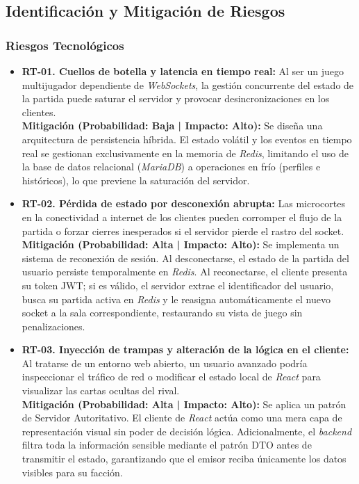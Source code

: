 \subsection{Identificación y Mitigación de Riesgos}

\subsubsection{Riesgos Tecnológicos}

\begin{itemize}
    \item \textbf{RT-01. Cuellos de botella y latencia en tiempo real:} Al ser un juego multijugador dependiente de \textit{WebSockets}, la gestión concurrente del estado de la partida puede saturar el servidor y provocar desincronizaciones en los clientes. \\
    \textbf{Mitigación (Probabilidad: Baja | Impacto: Alto):} Se diseña una arquitectura de persistencia híbrida. El estado volátil y los eventos en tiempo real se gestionan exclusivamente en la memoria de \textit{Redis}, limitando el uso de la base de datos relacional (\textit{MariaDB}) a operaciones en frío (perfiles e históricos), lo que previene la saturación del servidor.
    
    \item \textbf{RT-02. Pérdida de estado por desconexión abrupta:} Las microcortes en la conectividad a internet de los clientes pueden corromper el flujo de la partida o forzar cierres inesperados si el servidor pierde el rastro del socket. \\
    \textbf{Mitigación (Probabilidad: Alta | Impacto: Alto):} Se implementa un sistema de reconexión de sesión. Al desconectarse, el estado de la partida del usuario persiste temporalmente en \textit{Redis}. Al reconectarse, el cliente presenta su token JWT; si es válido, el servidor extrae el identificador del usuario, busca su partida activa en \textit{Redis} y le reasigna automáticamente el nuevo socket a la sala correspondiente, restaurando su vista de juego sin penalizaciones.
    
    \item \textbf{RT-03. Inyección de trampas y alteración de la lógica en el cliente:} Al tratarse de un entorno web abierto, un usuario avanzado podría inspeccionar el tráfico de red o modificar el estado local de \textit{React} para visualizar las cartas ocultas del rival. \\
    \textbf{Mitigación (Probabilidad: Alta | Impacto: Alto):} Se aplica un patrón de Servidor Autoritativo. El cliente de \textit{React} actúa como una mera capa de representación visual sin poder de decisión lógica. Adicionalmente, el \textit{backend} filtra toda la información sensible mediante el patrón DTO antes de transmitir el estado, garantizando que el emisor reciba únicamente los datos visibles para su facción.
    

\end{itemize}
